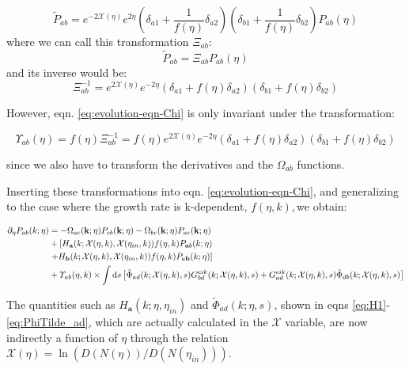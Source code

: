 \begin{equation}
\tilde{P}_{ab}=e^{-2\mathcal{X}(\eta)}e^{2\eta}(\delta_{a1}+\frac{1}{f(\eta)}\delta_{a2})(\delta_{b1}+\frac{1}{f(\eta)}\delta_{b2})P_{ab}(\eta)\label{eq:PS-transformation}
\end{equation}
where we can call this transformation $\varXi_{ab}$: 
\[
\tilde{P}_{ab}=\varXi_{ab}P_{ab}(\eta)
\]
and its inverse would be: 
\begin{equation}
\varXi_{ab}^{-1}=e^{2\mathcal{X}(\eta)}e^{-2\eta}(\delta_{a1}+f(\eta)\delta_{a2})(\delta_{b1}+f(\eta)\delta_{b2})
\end{equation}


However, eqn. \ref{eq:evolution-eqn-Chi} is only invariant under
the transformation:

\begin{equation}
\varUpsilon_{ab}(\eta)=f(\eta)\varXi_{ab}^{-1}=f(\eta)e^{2\mathcal{X}(\eta)}e^{-2\eta}(\delta_{a1}+f(\eta)\delta_{a2})(\delta_{b1}+f(\eta)\delta_{b2})
\end{equation}


since we also have to transform the derivatives and the $\Omega_{ab}$
functions. 

Inserting these transformations into eqn. \ref{eq:evolution-eqn-Chi},
and generalizing to the case where the growth rate is k-dependent,
$f(\eta,k),$we obtain:

\begin{align}
\partial_{\mathcal{\eta}}P_{ab}(k;\eta) & =-\Omega_{ac}(\mathbf{k};\eta) P_{cb}(\mathbf{k};\eta)-\Omega_{bc}(\mathbf{k};\eta) P_{ac}(\mathbf{k};\eta)\label{eq:evolution-eqn-Chi-eta}\\
 & +\left[H_{\mathbf{a}}(k;\mathcal{X}(\eta,k),\mathcal{X}(\eta_{in},k))f(\eta,k)P_{\mathbf{a}b}(k;\eta)\right.\nonumber \\
 & \left.+H_{\mathbf{b}}(k;\mathcal{X}(\eta,k),\mathcal{X}(\eta_{in},k))f(\eta,k)P_{a\mathbf{b}}(k;\eta)\right]\nonumber \\
 & +\varUpsilon_{ab}(\eta,k)\times\int\mathrm{d} s\left[\tilde{\Phi}_{ad}(k;\mathcal{X}(\eta,k),s)G_{bd}^{eik}(k;\mathcal{X}(\eta,k),s)+G_{ad}^{eik}(k;\mathcal{X}(\eta,k),s)\tilde{\Phi}_{db}(k;\mathcal{X}(\eta,k),s)\right]\nonumber 
\end{align}


The quantities such as $H_{\mathbf{a}}(k;\eta,\eta_{in})$ and $\tilde{\Phi}_{ad}(k;\mathcal{\eta},s)$,
shown in eqns \ref{eq:H1}-\ref{eq:PhiTilde_ad}, which are actually
calculated in the $\mathcal{X}$ variable, are now indirectly a function
of $\eta$ through the relation $\mathcal{X}(\eta)=\ln(D(N(\eta))/D(N(\eta_{in})))$.

